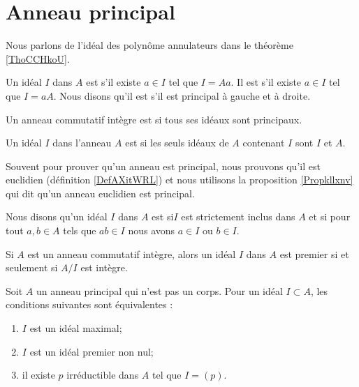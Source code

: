 \section{Anneau principal}

Nous parlons de l'idéal des polynôme annulateurs dans le théorème \ref{ThoCCHkoU}.

\begin{definition}      \label{DefIdPrinpuMrbOq}
    Un idéal \( I\) dans \( A\) est  s'il existe \( a\in I\) tel que \( I= A a\). Il est  s'il existe \( a\in I\) tel que \( I=a A\). Nous disons qu'il est  s'il est principal à gauche et à droite.

    Un anneau commutatif intègre est  si tous ses idéaux sont principaux.
\end{definition}

Un idéal \( I\) dans l'anneau \( A\) est  si les seuls idéaux de \( A\) contenant \( I\) sont \( I\) et \( A\).

Souvent pour prouver qu'un anneau est principal, nous prouvons qu'il est euclidien (définition \ref{DefAXitWRL}) et nous utilisons la proposition \ref{Propkllxnv} qui dit qu'un anneau euclidien est principal.


\begin{definition}
    Nous disons qu'un idéal \( I\) dans \( A\) est  si\( I\) est strictement inclus dans \( A\) et si pour tout \( a,b\in A\) tels que \( ab\in I\) nous avons \( a\in I\) ou \( b\in I\).
\end{definition}

\begin{proposition}
    Si \( A\) est un anneau commutatif intègre, alors un idéal \( I\) dans \( A\) est premier si et seulement si \( A/I\) est intègre. 
\end{proposition}

\begin{proposition} \label{PropomqcGe}
    Soit \( A\) un anneau principal qui n'est pas un corps. Pour un idéal \( I\subset A\), les conditions suivantes sont équivalentes :
    \begin{enumerate}
        \item
            \( I\) est un idéal maximal;
        \item
            \( I\) est un idéal premier non nul;
        \item
            il existe \( p\) irréductible dans \( A\) tel que \( I=(p)\).
    \end{enumerate}
\end{proposition}

